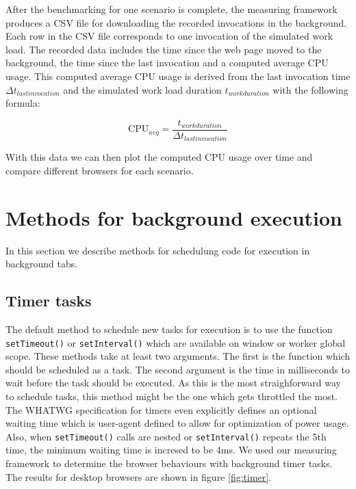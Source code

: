 \documentclass[
	ruledheaders=section,%
	class=report,%
	thesis={type=bachelor},%
	accentcolor=9c,%
	custommargins=true,%
	marginpar=false,%
	parskip=half-,%
	fontsize=11pt,%
]{tudapub}
\begin{document}
  After the benchmarking for one scenario is complete, the measuring framework produces a CSV file for downloading the recorded invocations in the background. Each row in the CSV file corresponds to one invocation of the simulated work load. The recorded data includes the time since the web page moved to the background, the time since the last invocation and a computed average CPU usage. This computed average CPU usage is derived from the last invocation time $\Delta t_{last invocation}$ and the simulated work load duration $t_{work duration}$  with the following formula:

  \begin{equation*}
    \text{CPU}_{avg} = \frac{t_{work duration}}{\Delta t_{last invocation}}
  \end{equation*}

  With this data we can then plot the computed CPU usage over time and compare different browsers for each scenario.


  \section{Methods for background execution}

  In this section we describe methods for schedulung code for execution in background tabs.
  
  \subsection{Timer tasks}
  \label{sec:timer-tasks}

  The default method to schedule new tasks for execution is to use the function \texttt{setTimeout()} or \texttt{setInterval()} which are available on window or worker global scope. These methods take at least two arguments. The first is the function which should be scheduled as a task. The second argument is the time in milliseconds to wait before the task should be executed. As this is the most straighforward way to schedule tasks, this method might be the one which gets throttled the most. The WHATWG specification for timers \cite{whatwg-timers} even explicitly defines an optional waiting time which is user-agent defined to allow for optimization of power usage. Also, when \texttt{setTimeout()} calls are nested or \texttt{setInterval()} repeats the 5th time, the minimum waiting time is incresed to be 4ms. We used our measuring framework to determine the browser behaviours with background timer tasks. The results for desktop browsers are shown in figure \ref{fig:timer}.
\end{document}
